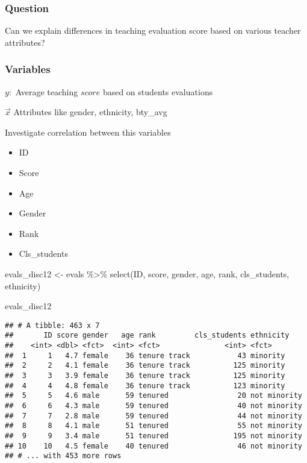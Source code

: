 \documentclass[
]{article}
\newenvironment{Shaded}{\begin{snugshade}}{\end{snugshade}}
\newcommand{\FunctionTok}[1]{\textcolor[rgb]{0.00,0.00,0.00}{#1}}
\newcommand{\NormalTok}[1]{#1}
\newcommand{\OtherTok}[1]{\textcolor[rgb]{0.56,0.35,0.01}{#1}}
\newcommand{\SpecialCharTok}[1]{\textcolor[rgb]{0.00,0.00,0.00}{#1}}
\providecommand{\tightlist}{%
  \setlength{\itemsep}{0pt}\setlength{\parskip}{0pt}}
\begin{document}
\hypertarget{question}{%
\subsubsection{Question}\label{question}}

Can we explain differences in teaching evaluation score based on various
teacher attributes?

\hypertarget{variables}{%
\subsubsection{Variables}\label{variables}}

\(y:\) Average teaching \(score\) based on students evaluations

\(\vec{x}\) Attributes like gender, ethnicity, bty\_avg

Investigate correlation between this variables

\begin{itemize}
\tightlist
\item
  ID
\item
  Score
\item
  Age
\item
  Gender
\item
  Rank
\item
  Cls\_students
\end{itemize}

\begin{Shaded}
\begin{Highlighting}[]
\NormalTok{evals\_disc12 }\OtherTok{\textless{}{-}}\NormalTok{ evals }\SpecialCharTok{\%\textgreater{}\%} 
  \FunctionTok{select}\NormalTok{(ID, score, gender, age, rank, cls\_students, ethnicity)}

\NormalTok{evals\_disc12}
\end{Highlighting}
\end{Shaded}

\begin{verbatim}
## # A tibble: 463 x 7
##       ID score gender   age rank         cls_students ethnicity   
##    <int> <dbl> <fct>  <int> <fct>               <int> <fct>       
##  1     1   4.7 female    36 tenure track           43 minority    
##  2     2   4.1 female    36 tenure track          125 minority    
##  3     3   3.9 female    36 tenure track          125 minority    
##  4     4   4.8 female    36 tenure track          123 minority    
##  5     5   4.6 male      59 tenured                20 not minority
##  6     6   4.3 male      59 tenured                40 not minority
##  7     7   2.8 male      59 tenured                44 not minority
##  8     8   4.1 male      51 tenured                55 not minority
##  9     9   3.4 male      51 tenured               195 not minority
## 10    10   4.5 female    40 tenured                46 not minority
## # ... with 453 more rows
\end{verbatim}
\end{document}
